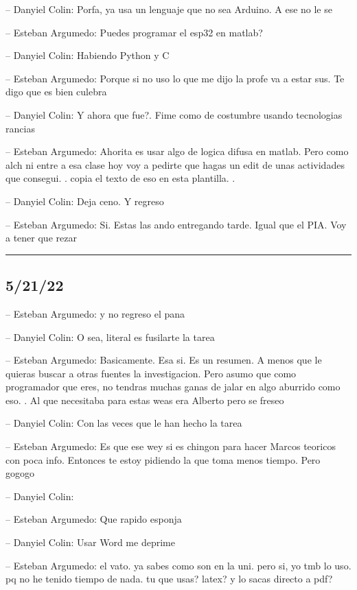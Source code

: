 -- Danyiel Colin: Porfa, ya usa un lenguaje que no sea Arduino. A ese no
le se

-- Esteban Argumedo: Puedes programar el esp32 en matlab?

-- Danyiel Colin: Habiendo Python y C

-- Esteban Argumedo: Porque si no uso lo que me dijo la profe va a estar
sus. Te digo que es bien culebra

-- Danyiel Colin: Y ahora que fue?. Fime como de costumbre usando
tecnologias rancias

-- Esteban Argumedo: Ahorita es usar algo de logica difusa en matlab.
Pero como alch ni entre a esa clase hoy voy a pedirte que hagas un edit
de unas actividades que consegui. . copia el texto de eso en esta
plantilla. .

-- Danyiel Colin: Deja ceno. Y regreso

-- Esteban Argumedo: Si. Estas las ando entregando tarde. Igual que el
PIA. Voy a tener que rezar

\begin{center}\rule{0.5\linewidth}{0.5pt}\end{center}

\hypertarget{section-82}{%
\subsection{5/21/22}\label{section-82}}

-- Esteban Argumedo: y no regreso el pana

-- Danyiel Colin: O sea, literal es fusilarte la tarea

-- Esteban Argumedo: Basicamente. Esa si. Es un resumen. A menos que le
quieras buscar a otras fuentes la investigacion. Pero asumo que como
programador que eres, no tendras muchas ganas de jalar en algo aburrido
como eso. . Al que necesitaba para estas weas era Alberto pero se freseo

-- Danyiel Colin: Con las veces que le han hecho la tarea

-- Esteban Argumedo: Es que ese wey si es chingon para hacer Marcos
teoricos con poca info. Entonces te estoy pidiendo la que toma menos
tiempo. Pero gogogo

-- Danyiel Colin:

-- Esteban Argumedo: Que rapido esponja

-- Danyiel Colin: Usar Word me deprime

-- Esteban Argumedo: el vato. ya sabes como son en la uni. pero si, yo
tmb lo uso. pq no he tenido tiempo de nada. tu que usas? latex? y lo
sacas directo a pdf?

